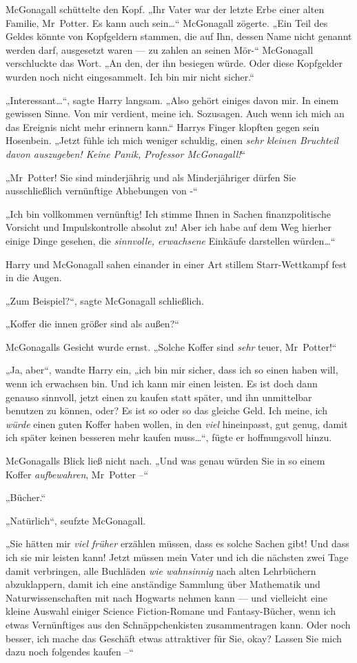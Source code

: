 McGonagall schüttelte den Kopf. „Ihr Vater war der letzte Erbe einer alten Familie, Mr~Potter. Es kann auch sein…“ McGonagall zögerte. „Ein Teil des Geldes könnte von Kopfgeldern stammen, die auf Ihn, dessen Name nicht genannt werden darf, ausgesetzt waren — zu zahlen an seinen Mör-“ McGonagall verschluckte das Wort. „An den, der ihn besiegen würde. Oder diese Kopfgelder wurden noch nicht eingesammelt. Ich bin mir nicht sicher.“

„Interessant…“, sagte Harry langsam. „Also gehört einiges davon mir. In einem gewissen Sinne. Von mir verdient, meine ich. Sozusagen. Auch wenn ich mich an das Ereignis nicht mehr erinnern kann.“ Harrys Finger klopften gegen sein Hosenbein. „Jetzt fühle ich mich weniger schuldig, einen \emph{sehr kleinen Bruchteil davon auszugeben! Keine Panik, Professor McGonagall!}“

„Mr~Potter! Sie sind minderjährig und als Minderjähriger dürfen Sie ausschließlich vernünftige Abhebungen von -“

„Ich bin vollkommen vernünftig! Ich stimme Ihnen in Sachen finanzpolitische Vorsicht und Impulskontrolle absolut zu! Aber ich habe auf dem Weg hierher einige Dinge gesehen, die \emph{sinnvolle, erwachsene} Einkäufe darstellen würden…“

Harry und McGonagall sahen einander in einer Art stillem Starr-Wettkampf fest in die Augen.

„Zum Beispiel?“, sagte McGonagall schließlich.

„Koffer die innen größer sind als außen?“

McGonagalls Gesicht wurde ernst. „Solche Koffer sind \emph{sehr} teuer, Mr~Potter!“

„Ja, aber“, wandte Harry ein, „ich bin mir sicher, dass ich so einen haben will, wenn ich erwachsen bin. Und ich kann mir einen leisten. Es ist doch dann genauso sinnvoll, jetzt einen zu kaufen statt später, und ihn unmittelbar benutzen zu können, oder? Es ist so oder so das gleiche Geld. Ich meine, ich \emph{würde} einen guten Koffer haben wollen, in den \emph{viel} hineinpasst, gut genug, damit ich später keinen besseren mehr kaufen muss…“, fügte er hoffnungsvoll hinzu.

McGonagalls Blick ließ nicht nach. „Und was genau würden Sie in so einem Koffer \emph{aufbewahren}, Mr~Potter –“

„Bücher.“

„Natürlich“, seufzte McGonagall.

„Sie hätten mir \emph{viel früher} erzählen müssen, dass es solche Sachen gibt! Und dass ich sie mir leisten kann! Jetzt müssen mein Vater und ich die nächsten zwei Tage damit verbringen, alle Buchläden \emph{wie wahnsinnig} nach alten Lehrbüchern abzuklappern, damit ich eine anständige Sammlung über Mathematik und Naturwissenschaften mit nach Hogwarts nehmen kann — und vielleicht eine kleine Auswahl einiger Science Fiction-Romane und Fantasy-Bücher, wenn ich etwas Vernünftiges aus den Schnäppchenkisten zusammentragen kann. Oder noch besser, ich mache das Geschäft etwas attraktiver für Sie, okay? Lassen Sie mich dazu noch folgendes kaufen –“

